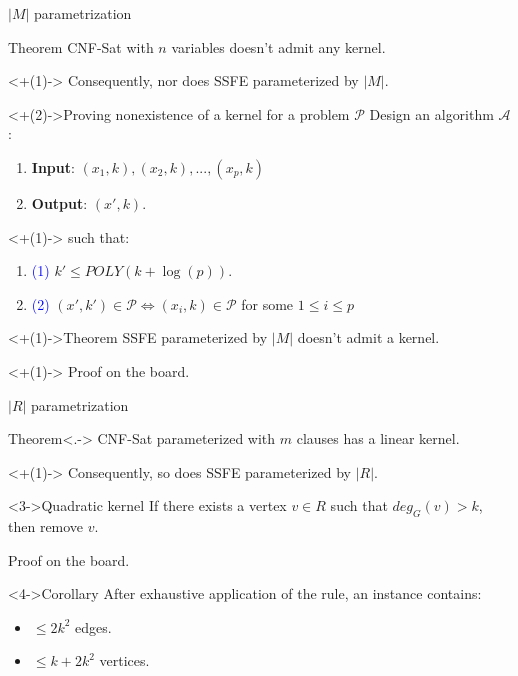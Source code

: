 \documentclass{beamer}
\begin{document}
\begin{frame}[t]{$|M|$ parametrization}
	\only<-2> {
		\begin{block}{Theorem}
			CNF-Sat with $n$ variables doesn't admit any kernel.
		\end{block}
		\onslide<+(1)-> { Consequently, nor does SSFE parameterized by $|M|$. }
	}
	
	
	\begin{block}<+(2)->{Proving nonexistence of a kernel for a problem $\mathcal{P}$}
		Design an algorithm $\mathcal{A}$:
		\begin{enumerate}[<+(2)->]
			\item[] \textbf{Input}: $(x_1,k),(x_2,k),...,(x_p,k)$
			\item[] \textbf{Output}: $(x',k)$.
		\end{enumerate}
		\onslide<+(1)-> {such that:}
		\begin{enumerate}[<+(1)->]
			\item[] \textcolor{blue}{(1)} $k' \leq POLY(k + \log(p))$.
			\item[] \textcolor{blue}{(2)} $(x',k') \in \mathcal{P} \iff (x_i,k) \in \mathcal{P}$ for some $1 \leq i \leq p$
		\end{enumerate}
	\end{block}

	\begin{block}<+(1)->{Theorem}
		SSFE parameterized by $|M|$ doesn't admit a kernel.
	\end{block}

	\onslide<+(1)-> {Proof on the board.}

\end{frame}

\begin{frame}[t]{$|R|$ parametrization}
	\only<-2> {
		\begin{block}{Theorem}<.->
			CNF-Sat parameterized with $m$ clauses has a linear kernel.
		\end{block}
		\onslide<+(1)-> { Consequently, so does SSFE parameterized by $|R|$.}
	}
	\begin{block}<3->{Quadratic kernel}
		If there exists a vertex $v \in R$ such that $deg_G(v) > k$, then remove $v$.
	\end{block}

	 { Proof on the board. }
	\begin{block}<4->{Corollary}
		After exhaustive application of the rule, an instance contains:
		\begin{itemize}[<+(4)->]
			\item[] $\leq 2k^2$ edges.
			\item[] $\leq k + 2k^2$ vertices.
		\end{itemize}
	\end{block}
\end{frame}
\end{document}
